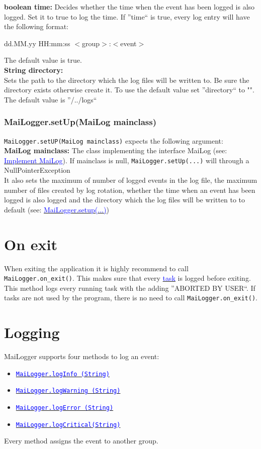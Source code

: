 \documentclass{article}
\newcommand{\refh}[2]{\hyperref[#1] {\textcolor{blue}{#2}}}
\newcommand{\logInfo}{\refh{logging_info}{\lstinline|MaiLogger.logInfo (String)|}}
\newcommand{\logWarning}{\refh{logging_warning}{\lstinline|MaiLogger.logWarning (String)|}}
\newcommand{\logError}{\refh{logging_error}{\lstinline|MaiLogger.logError (String)|}}
\newcommand{\logCritical}{\refh{logging_critical}{\lstinline|MaiLogger.logCritical(String)|}}
\begin{document}
    \textbf{boolean time:}
    Decides whether the time when the event has been logged is also logged.
    Set it to true to log the time.
    If ''time`` is true, every log entry will have the following format:
    \begin{description}
        \item dd.MM.yy HH:mm:ss $<$group$>$:$<$event$>$
    \end{description}
    The default value is true. \\

    \textbf{String directory:} \\
    Sets the path to the directory which the log files will be written to.
    Be sure the directory exists otherwise create it.
    To use the default value set ''directory`` to "".
    The default value is ''/../logs`` \\

    \subsubsection{MaiLogger.setUp(MaiLog mainclass)}
    \label{setup_mailogger.setup_2}
    \lstinline|MaiLogger.setUP(MaiLog mainclass)| expects the following argument: \\

    \textbf{MaiLog mainclass:}
    The class implementing the interface MaiLog (see: \refh{setup_interface}{Implement MaiLog}).
    If mainclass is null, \lstinline|MaiLogger.setUp(...)| will through a NullPointerException \\

    It also sets the maximum of number of logged events in the log file, the maximum number of files created by log rotation, whether the time when an event has been logged is also logged and the directory which the log files will be written to to default (see: \refh{setup_mailogger.setup_1}{MaiLogger.setup(...)})

\section{On exit}
\label{on_exit}
    When exiting the application it is highly recommend to call \lstinline|MaiLogger.on_exit()|.
    This makes sure that every \refh{tasks}{task} is logged before exiting.
    This method logs every running task with the adding ''ABORTED BY USER``.
    If tasks are not used by the program, there is no need to call \lstinline|MaiLogger.on_exit()|.

\section{Logging}
\label{logging}
    MaiLogger supports four methods to log an event:
    \begin{itemize}
        \item \logInfo
        \item \logWarning
        \item \logError
        \item \logCritical
    \end{itemize}
    Every method assigns the event to another group.
\end{document}
